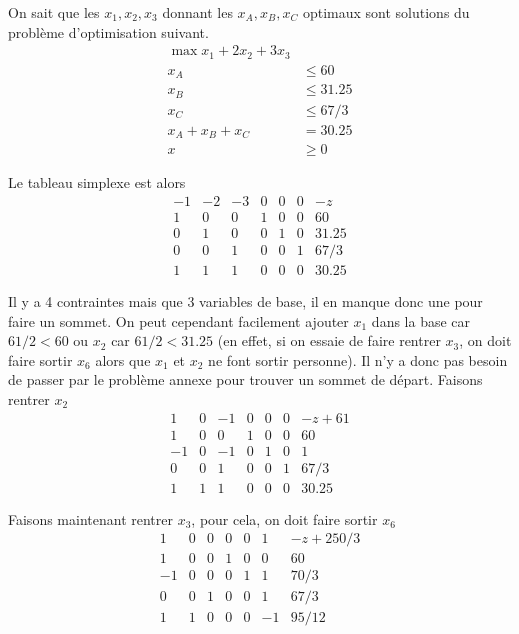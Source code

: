 \begin{enumerate}
\begin{solution}
      On sait que les $x_1,x_2,x_3$ donnant les $x_A,x_B,x_C$ optimaux
      sont solutions du problème d'optimisation suivant.
      \begin{align*}
        \max x_1 + 2x_2 + 3x_3\\
        x_A & \leq 60\\
        x_B & \leq 31.25\\
        x_C & \leq 67/3\\
        x_A + x_B + x_C & = 30.25\\
        x & \geq 0
      \end{align*}

      Le tableau simplexe est alors
      \[
        \begin{array}{cccccc|l}
          -1 & -2 & -3 & 0 & 0 & 0 & -z\\
          \hline
          1 & 0 & 0 & 1 & 0 & 0 & 60\\
          0 & 1 & 0 & 0 & 1 & 0 & 31.25\\
          0 & 0 & 1 & 0 & 0 & 1 & 67/3\\
          1 & 1 & 1 & 0 & 0 & 0 & 30.25
        \end{array}
      \]

      Il y a 4 contraintes mais que 3 variables de base, il en manque donc
      une pour faire un sommet.
      On peut cependant facilement ajouter $x_1$ dans la base
      car $61/2 < 60$ ou $x_2$ car $61/2 < 31.25$ (en effet,
      si on essaie de faire rentrer $x_3$, on doit faire sortir $x_6$
      alors que $x_1$ et $x_2$ ne font sortir personne).
      Il n'y a donc pas besoin de passer par le problème annexe pour trouver
      un sommet de départ.
      Faisons rentrer $x_2$
      \[
        \begin{array}{cccccc|l}
           1 & 0 & -1 & 0 & 0 & 0 & -z + 61\\
          \hline
           1 & 0 &  0 & 1 & 0 & 0 & 60\\
          -1 & 0 & -1 & 0 & 1 & 0 & 1\\
           0 & 0 &  1 & 0 & 0 & 1 & 67/3\\
           1 & 1 &  1 & 0 & 0 & 0 & 30.25
        \end{array}
      \]

      Faisons maintenant rentrer $x_3$, pour cela, on doit faire sortir $x_6$
      \[
        \begin{array}{cccccc|l}
           1 & 0 & 0 & 0 & 0 &  1 & -z + 250/3\\
          \hline
           1 & 0 & 0 & 1 & 0 &  0 & 60\\
          -1 & 0 & 0 & 0 & 1 &  1 & 70/3\\
           0 & 0 & 1 & 0 & 0 &  1 & 67/3\\
           1 & 1 & 0 & 0 & 0 & -1 & 95/12
        \end{array}
      \]


\end{solution}
\end{enumerate}
